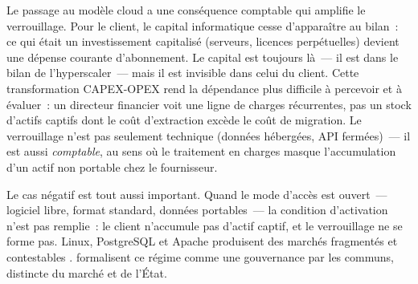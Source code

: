 Le passage au modèle cloud a une conséquence comptable qui amplifie le verrouillage. Pour le client, le capital informatique cesse d'apparaître au bilan~: ce qui était un investissement capitalisé (serveurs, licences perpétuelles) devient une dépense courante d'abonnement. Le capital est toujours là~--- il est dans le bilan de l'hyperscaler~--- mais il est invisible dans celui du client. Cette transformation CAPEX-OPEX rend la dépendance plus difficile à percevoir et à évaluer~: un directeur financier voit une ligne de charges récurrentes, pas un stock d'actifs captifs dont le coût d'extraction excède le coût de migration. Le verrouillage n'est pas seulement technique (données hébergées, API fermées)~--- il est aussi \emph{comptable}, au sens où le traitement en charges masque l'accumulation d'un actif non portable chez le fournisseur.

Le cas négatif est tout aussi important. Quand le mode d'accès est ouvert~--- logiciel libre, format standard, données portables~--- la condition d'activation n'est pas remplie~: le client n'accumule pas d'actif captif, et le verrouillage ne se forme pas. Linux, PostgreSQL et Apache produisent des marchés fragmentés et contestables \parencite{benkler_wealth_2006}. \textcite{hess_understanding_2007} formalisent ce régime comme une gouvernance par les communs, distincte du marché et de l'État.

